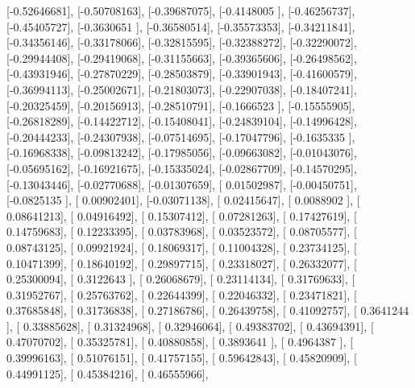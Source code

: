 \documentclass{article}
\begin{document}
       [-0.52646681],
       [-0.50708163],
       [-0.39687075],
       [-0.4148005 ],
       [-0.46256737],
       [-0.45405727],
       [-0.3630651 ],
       [-0.36580514],
       [-0.35573353],
       [-0.34211841],
       [-0.34356146],
       [-0.33178066],
       [-0.32815595],
       [-0.32388272],
       [-0.32290072],
       [-0.29944408],
       [-0.29419068],
       [-0.31155663],
       [-0.39365606],
       [-0.26498562],
       [-0.43931946],
       [-0.27870229],
       [-0.28503879],
       [-0.33901943],
       [-0.41600579],
       [-0.36994113],
       [-0.25002671],
       [-0.21803073],
       [-0.22907038],
       [-0.18407241],
       [-0.20325459],
       [-0.20156913],
       [-0.28510791],
       [-0.1666523 ],
       [-0.15555905],
       [-0.26818289],
       [-0.14422712],
       [-0.15408041],
       [-0.24839104],
       [-0.14996428],
       [-0.20444233],
       [-0.24307938],
       [-0.07514695],
       [-0.17047796],
       [-0.1635335 ],
       [-0.16968338],
       [-0.09813242],
       [-0.17985056],
       [-0.09663082],
       [-0.01043076],
       [-0.05695162],
       [-0.16921675],
       [-0.15335024],
       [-0.02867709],
       [-0.14570295],
       [-0.13043446],
       [-0.02770688],
       [-0.01307659],
       [ 0.01502987],
       [-0.00450751],
       [-0.0825135 ],
       [ 0.00902401],
       [-0.03071138],
       [ 0.02415647],
       [ 0.0088902 ],
       [ 0.08641213],
       [ 0.04916492],
       [ 0.15307412],
       [ 0.07281263],
       [ 0.17427619],
       [ 0.14759683],
       [ 0.12233395],
       [ 0.03783968],
       [ 0.03523572],
       [ 0.08705577],
       [ 0.08743125],
       [ 0.09921924],
       [ 0.18069317],
       [ 0.11004328],
       [ 0.23734125],
       [ 0.10471399],
       [ 0.18640192],
       [ 0.29897715],
       [ 0.23318027],
       [ 0.26332077],
       [ 0.25300094],
       [ 0.3122643 ],
       [ 0.26068679],
       [ 0.23114134],
       [ 0.31769633],
       [ 0.31952767],
       [ 0.25763762],
       [ 0.22644399],
       [ 0.22046332],
       [ 0.23471821],
       [ 0.37685848],
       [ 0.31736838],
       [ 0.27186786],
       [ 0.26439758],
       [ 0.41092757],
       [ 0.3641244 ],
       [ 0.33885628],
       [ 0.31324968],
       [ 0.32946064],
       [ 0.49383702],
       [ 0.43694391],
       [ 0.47070702],
       [ 0.35325781],
       [ 0.40880858],
       [ 0.3893641 ],
       [ 0.4964387 ],
       [ 0.39996163],
       [ 0.51076151],
       [ 0.41757155],
       [ 0.59642843],
       [ 0.45820909],
       [ 0.44991125],
       [ 0.45384216],
       [ 0.46555966],
\end{document}
